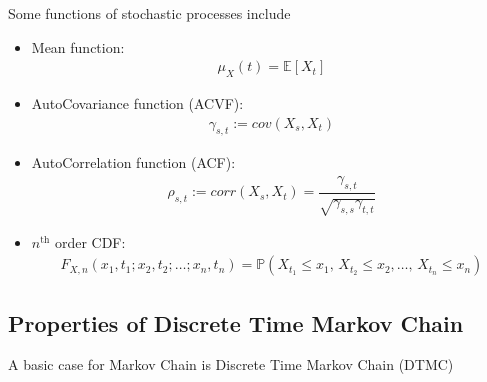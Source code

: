 Some functions of stochastic processes include
\begin{itemize}[topsep=2pt,itemsep=0pt]
    \item Mean function:
    \begin{align}
        \mu _X(t)=\mathbb{E}\left[ X_t \right]  
    \end{align}
    \item AutoCovariance function (ACVF):
    \begin{align}
        \gamma _{s,t}:=cov(X_s,X_t)
    \end{align}
    \item AutoCorrelation function (ACF):
    \begin{align}
        \rho _{s,t}:=corr(X_s,X_t)=\dfrac{\gamma _{s,t}}{\sqrt{\gamma _{s,s}\gamma _{t,t}}} 
    \end{align}
    \item $ n^\mathrm{th}  $ order CDF:
    \begin{align}
        F_{X,n}(x_1,t_1;x_2,t_2;\ldots;x_n,t_n)=\mathbb{P}\left( X_{t_1}\leq x_1,\,X_{t_2}\leq x_2,\ldots,\,X_{t_n}\leq x_n \right)  
    \end{align}
   
\end{itemize}



    
    
    
    

    


\subsection{Properties of Discrete Time Markov Chain}\label{SubSubSectionDTMC}
A basic case for Markov Chain is Discrete Time Markov Chain (DTMC)

